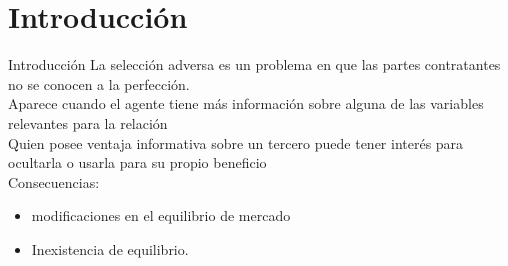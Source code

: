 \section{Introducción}

\begin{frame}{Introducción}
	La selección adversa es un problema en que las partes contratantes no se conocen a la perfección.\\[0.3cm]
	
	Aparece cuando el agente tiene más información sobre alguna de las variables relevantes para la relación\\[0.3cm]
	
	Quien posee ventaja informativa sobre un tercero puede tener interés para ocultarla o usarla para su propio beneficio\\[0.3cm]
	
	Consecuencias:
		\begin{itemize}
			\item modificaciones en el equilibrio de mercado
			\item Inexistencia de equilibrio.
		\end{itemize}
\end{frame}